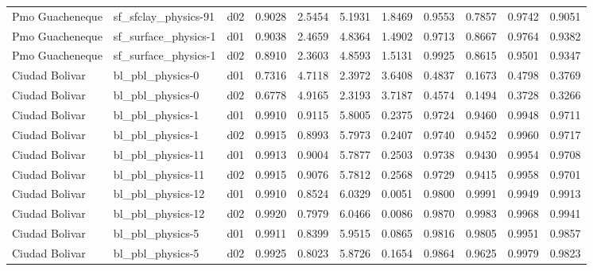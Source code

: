 \begin{longtable}{lllrrrrrrrr}
      Pmo Guacheneque  &  sf\_sfclay\_physics-91 &     d02 &   0.9028 &   2.5454 &   5.1931 &       1.8469 &        0.9553 &       0.7857 &           0.9742 &  0.9051 \\
      Pmo Guacheneque  &  sf\_surface\_physics-1 &     d01 &   0.9038 &   2.4659 &   4.8364 &       1.4902 &        0.9713 &       0.8667 &           0.9764 &  0.9382 \\
      Pmo Guacheneque  &  sf\_surface\_physics-1 &     d02 &   0.8910 &   2.3603 &   4.8593 &       1.5131 &        0.9925 &       0.8615 &           0.9501 &  0.9347 \\
       Ciudad Bolivar  &      bl\_pbl\_physics-0 &     d01 &   0.7316 &   4.7118 &   2.3972 &       3.6408 &        0.4837 &       0.1673 &           0.4798 &  0.3769 \\
       Ciudad Bolivar  &      bl\_pbl\_physics-0 &     d02 &   0.6778 &   4.9165 &   2.3193 &       3.7187 &        0.4574 &       0.1494 &           0.3728 &  0.3266 \\
       Ciudad Bolivar  &      bl\_pbl\_physics-1 &     d01 &   0.9910 &   0.9115 &   5.8005 &       0.2375 &        0.9724 &       0.9460 &           0.9948 &  0.9711 \\
       Ciudad Bolivar  &      bl\_pbl\_physics-1 &     d02 &   0.9915 &   0.8993 &   5.7973 &       0.2407 &        0.9740 &       0.9452 &           0.9960 &  0.9717 \\
       Ciudad Bolivar  &     bl\_pbl\_physics-11 &     d01 &   0.9913 &   0.9004 &   5.7877 &       0.2503 &        0.9738 &       0.9430 &           0.9954 &  0.9708 \\
       Ciudad Bolivar  &     bl\_pbl\_physics-11 &     d02 &   0.9915 &   0.9076 &   5.7812 &       0.2568 &        0.9729 &       0.9415 &           0.9958 &  0.9701 \\
       Ciudad Bolivar  &     bl\_pbl\_physics-12 &     d01 &   0.9910 &   0.8524 &   6.0329 &       0.0051 &        0.9800 &       0.9991 &           0.9949 &  0.9913 \\
       Ciudad Bolivar  &     bl\_pbl\_physics-12 &     d02 &   0.9920 &   0.7979 &   6.0466 &       0.0086 &        0.9870 &       0.9983 &           0.9968 &  0.9941 \\
       Ciudad Bolivar  &      bl\_pbl\_physics-5 &     d01 &   0.9911 &   0.8399 &   5.9515 &       0.0865 &        0.9816 &       0.9805 &           0.9951 &  0.9857 \\
       Ciudad Bolivar  &      bl\_pbl\_physics-5 &     d02 &   0.9925 &   0.8023 &   5.8726 &       0.1654 &        0.9864 &       0.9625 &           0.9979 &  0.9823 \\

\end{longtable}
